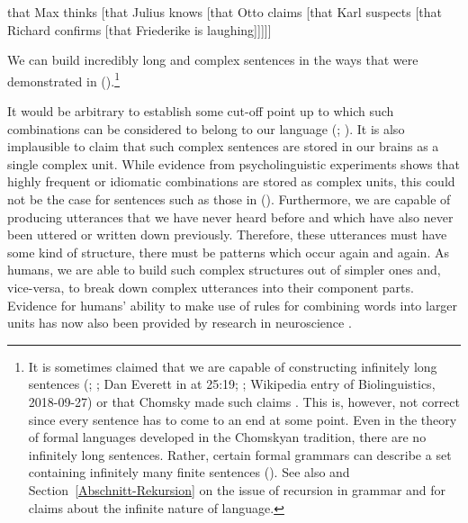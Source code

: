 \ea
\label{ex-that-max-thinks-that-recursion}
that Max thinks [that Julius knows [that Otto claims [that Karl suspects [that Richard confirms [that Friederike is laughing]]]]]
\z

\noindent
We can build incredibly long and complex sentences in the ways that were demonstrated in ().\footnote{%
 It is sometimes claimed that we are capable of constructing infinitely long sentences (\citealp*[]{NKN2001a}; \citealp[]{KS2008a-u}; Dan Everett in  at 25:19;
 \citealp*[]{Chesi2015a-u}; Wikipedia entry of Biolinguistics, 2018-09-27) or that Chomsky made such claims \citep[]{Leiss2003a}. This is, however, not correct since every sentence
has to come to an end at some point. Even in the theory of formal languages developed in the Chomskyan
tradition, there are no infinitely long sentences. Rather, certain formal grammars can describe a
set containing infinitely many finite sentences (\citealp[]{Chomsky57a}). See also  and
 Section~\ref{Abschnitt-Rekursion} on the issue of recursion in grammar and for claims about the
 infinite nature of language.}


It would be arbitrary to establish some cut-off point up to which such combinations can
be considered to belong to our language (\citealp[]{Harris57a}; \citealp[]{Chomsky57a}). 
It is also implausible to claim that such complex sentences are stored in our brains as a single complex
unit. While evidence from psycholinguistic experiments shows that highly frequent or
idiomatic combinations are stored as complex units, this could not be the case for sentences such as
those in (). Furthermore, we are capable of producing utterances that we have never heard
before and which have also never been uttered or written down previously. Therefore, these utterances
must have some kind of structure, there must be patterns which occur again and again. As humans, we
are able to build such complex structures out of simpler ones and, vice-versa, to break down 
complex utterances into their component parts. Evidence for humans' ability to make use of rules for combining
words into larger units has now also been provided by research in neuroscience \citep[]{Pulvermueller2010a}.

